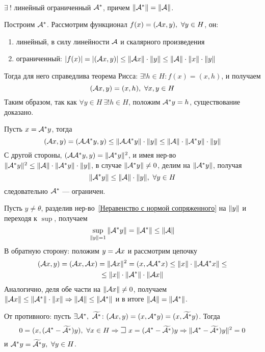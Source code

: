 \begin{theorem}
~\\
$\exists~!$ линейный ограниченный $ {\mathcal{A}}^*$, причем $\|{\mathcal{A}}^*\| = \|{\mathcal{A}}\| $.
\end{theorem}
\begin{proofocre}

\boxed{\exists}
Построим ${\mathcal{A}}^*$. Рассмотрим функционал $f(x) = ({\mathcal{A}} x, y),~\forall y\in H$, он:
\begin{enumerate}
    \item линейный, в силу линейности ${\mathcal{A}}$ и скалярного произведения
    \item ограниченный: $|f(x)|=|({\mathcal{A}} x, y)|\le\|{\mathcal{A}} x\|\cdot\|y\|\le\|{\mathcal{A}}\|\cdot\|x\|\cdot\|y\|$
\end{enumerate}
Тогда для него справедлива теорема Рисса: $\exists!h\in H\colon f(x) = (x, h)$, и получаем $$({\mathcal{A}} x, y) = (x, h),~\forall x,y\in H$$
Таким образом, так как $\forall y\in H~\exists!h\in H$, положим ${\mathcal{A}}^* y = h$, существование доказано.

 Пусть $x = {\mathcal{A}}^* y$, тогда
$$({\mathcal{A}} x, y)=({\mathcal{A}} {\mathcal{A}}^* y, y)\le\|{\mathcal{A}} {\mathcal{A}}^* y\|\cdot\|y\|\le\|{\mathcal{A}}\|\cdot\|{\mathcal{A}}^* y\|\cdot\|y\|$$
С другой стороны, $({\mathcal{A}} {\mathcal{A}}^* y, y)=\|{\mathcal{A}}^* y\|^2$, и имея нер-во $\|{\mathcal{A}}^* y\|^2\le\|{\mathcal{A}}\|\cdot\|{\mathcal{A}}^* y\|\cdot\|y\|$, в случае $\|{\mathcal{A}}^* y\|\ne0$, делим на $\|{\mathcal{A}}^* y\|$, получая
\begin{equation}
    \label{Неравенство с нормой сопряженного}
    \|{\mathcal{A}}^* y\|\le\|{\mathcal{A}}\|\cdot\|y\|,~\forall y\in H
\end{equation}
следовательно ${\mathcal{A}}^*$ --- ограничен.

 Пусть $y\ne\theta$, разделив нер-во~\ref{Неравенство с нормой сопряженного} на $\|y\|$ и переходя к $\sup$, получаем
$$\sup\limits_{\|y\| = 1}\|{\mathcal{A}}^* y\| = \|{\mathcal{A}}^*\|\le\|{\mathcal{A}}\|$$
В обратную сторону: положим $y={\mathcal{A}} x$ и рассмотрим цепочку
\begin{gather*}
    ({\mathcal{A}} x, y)=({\mathcal{A}} x, {\mathcal{A}} x)=\|{\mathcal{A}} x\|^2 = (x, {\mathcal{A}}{\mathcal{A}}^* x) \le \|x\|\cdot\|{\mathcal{A}}{\mathcal{A}}^* x\|\le\\
    \le\|x\|\cdot\|{\mathcal{A}}^*\|\cdot\|{\mathcal{A}} x\|
\end{gather*}
Аналогично, деля обе части на $\|{\mathcal{A}} x\|\ne 0$, получаем $\|{\mathcal{A}} x\|\le\|{\mathcal{A}}^*\|\cdot\|x\| \Rightarrow \|{\mathcal{A}}\|\le\|{\mathcal{A}}^*\|$ и в итоге $\|{\mathcal{A}}\|=\|{\mathcal{A}}^*\|$.

 От противного: пусть $\exists{\mathcal{A}}^*,~\widetilde{{\mathcal{A}}^*}\colon({\mathcal{A}} x, y) = (x, {\mathcal{A}}^* y) = (x, \widetilde{{\mathcal{A}}^*} y)$. Тогда
$$0 = (x, (\mcA^* - \widetilde{\mcA^*}) y),~\forall x\in H \Rightarrow \mathLet~x=(\mcA^* - \widetilde{\mcA^*})y \Rightarrow \sqnorm{\mcA^* - \widetilde{\mcA^*}) y} = 0$$
и ${\mathcal{A}}^* y = \widetilde{{\mathcal{A}}^*}y,~\forall y\in H$.
\end{proofocre}

